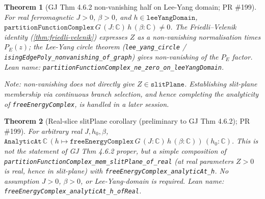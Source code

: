 \documentclass[a4paper,11pt]{article}
\newtheorem{theorem}{Theorem}
\begin{document}
\begin{theorem}[GJ Thm 4.6.2 non-vanishing half on Lee-Yang domain; PR \#199]
For real ferromagnetic $J > 0$, $\beta > 0$, and
$h \in \texttt{leeYangDomain}$,
$\texttt{partitionFunctionComplex}\,G\,(J:\mathbb C)\,h\,(\beta:\mathbb C)
\ne 0$.
The Friedli--Velenik identity (\ref{thm:friedli-velenik}) expresses
$Z$ as a non-vanishing normalisation times $P_E(z)$; the Lee-Yang
circle theorem
(\texttt{lee\_yang\_circle} / \texttt{isingEdgePoly\_nonvanishing\_of\_graph})
gives non-vanishing of the $P_E$ factor.
Lean name: \texttt{partitionFunctionComplex\_ne\_zero\_on\_leeYangDomain}.

Note: non-vanishing does not directly give $Z \in \texttt{slitPlane}$.
Establishing slit-plane membership via continuous branch selection, and
hence completing the analyticity of \texttt{freeEnergyComplex}, is
handled in a later session.
\end{theorem}

\begin{theorem}[Real-slice slitPlane corollary (preliminary to GJ Thm 4.6.2); PR \#199]
For arbitrary real $J, h_0, \beta$,
$\texttt{AnalyticAt}\,\mathbb C\,
  (h \mapsto \texttt{freeEnergyComplex}\,G\,(J:\mathbb C)\,h\,(\beta:\mathbb C))\,
  (h_0:\mathbb C)$.
This is not the statement of GJ Thm 4.6.2 proper, but a simple
composition of
\texttt{partitionFunctionComplex\_mem\_slitPlane\_of\_real}
(at real parameters $Z > 0$ is real, hence in slit-plane) with
\texttt{freeEnergyComplex\_analyticAt\_h}. No assumption $J > 0$,
$\beta > 0$, or Lee-Yang-domain is required.
Lean name: \texttt{freeEnergyComplex\_analyticAt\_h\_ofReal}.
\end{theorem}
\end{document}
